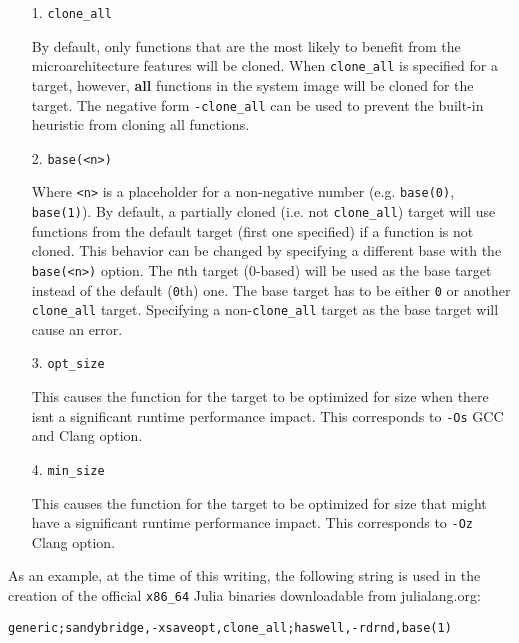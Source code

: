 \begin{itemize}
\item[1. ] \texttt{clone\_all}

By default, only functions that are the most likely to benefit from  the microarchitecture features will be cloned.  When \texttt{clone\_all} is specified for a target, however,  \textbf{all} functions in the system image will be cloned for the target.  The negative form \texttt{-clone\_all} can be used to prevent the built-in  heuristic from cloning all functions.


\item[2. ] \texttt{base(<n>)}

Where \texttt{<n>} is a placeholder for a non-negative number (e.g. \texttt{base(0)}, \texttt{base(1)}).  By default, a partially cloned (i.e. not \texttt{clone\_all}) target will use functions  from the default target (first one specified) if a function is not cloned.  This behavior can be changed by specifying a different base with the \texttt{base(<n>)} option.  The \texttt{n}th target (0-based) will be used as the base target instead of the default (\texttt{0}th) one.  The base target has to be either \texttt{0} or another \texttt{clone\_all} target.  Specifying a non-\texttt{clone\_all} target as the base target will cause an error.


\item[3. ] \texttt{opt\_size}

This causes the function for the target to be optimized for size when there isn{\textquotesingle}t a significant  runtime performance impact. This corresponds to \texttt{-Os} GCC and Clang option.


\item[4. ] \texttt{min\_size}

This causes the function for the target to be optimized for size that might have  a significant runtime performance impact. This corresponds to \texttt{-Oz} Clang option.

\end{itemize}


As an example, at the time of this writing, the following string is used in the creation of the official \texttt{x86\_64} Julia binaries downloadable from julialang.org:




\begin{lstlisting}
generic;sandybridge,-xsaveopt,clone_all;haswell,-rdrnd,base(1)
\end{lstlisting}



